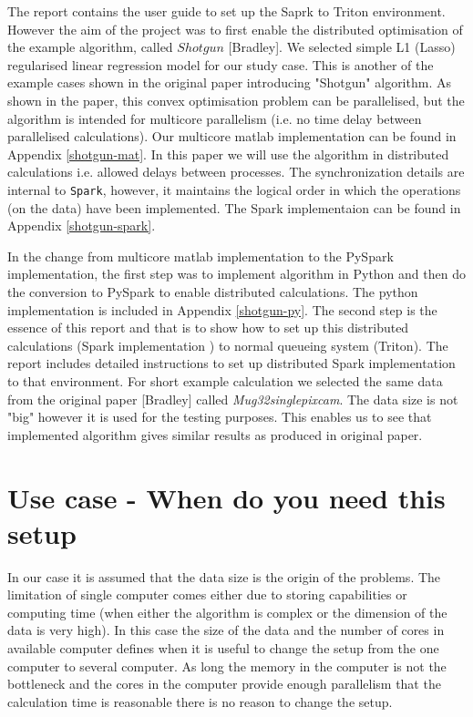 \documentclass[a4paper,11pt]{article}
\begin{document}
The report contains the user guide to set up the Saprk to Triton environment. However the aim of the project was to first enable the distributed optimisation of the example algorithm, called $Shotgun$ [Bradley]. We selected simple L1 (Lasso) regularised linear regression model for our study case. This is another of the example cases shown in the original paper introducing "Shotgun" algorithm. As shown in the paper, this convex optimisation problem can be parallelised, but the algorithm is intended for multicore  parallelism (i.e. no time delay between parallelised calculations). Our multicore matlab implementation can be found in  Appendix \ref{shotgun-mat}. In this paper we will use the algorithm in distributed calculations i.e. allowed delays between processes. The synchronization details are internal to \texttt{Spark}, however, it maintains the logical order in which the operations (on the data) have been implemented. The Spark implementaion can be found in Appendix \ref{shotgun-spark}. 

In the change from multicore matlab implementation to the PySpark implementation, the first step was to implement algorithm in Python and then do the conversion to PySpark to enable distributed calculations. The python implementation is included in Appendix \ref{shotgun-py}. The second step is the essence of this report and that is to show how to set up this distributed calculations (Spark implementation ) to normal queueing system (Triton). The report includes detailed instructions to set up distributed Spark implementation to that environment. For short example calculation we selected the same data from the original paper [Bradley] called \textit{Mug32singlepixcam}. The data size is not "big" however it is used for the testing purposes. This enables us to see that implemented algorithm gives similar results as produced in original paper. 

\section{Use case - When do you need this setup}

In our case it is assumed that the data size is the origin of the problems. The limitation of single computer comes either due to storing capabilities or computing time (when either the algorithm is complex or the dimension of the data is very high). In this case the size of the data and the number of cores in available computer defines when it is useful to change the setup from the one computer to several computer. As long the memory in the computer is not the bottleneck 
and the cores in the computer provide enough parallelism that the 
calculation time is reasonable there is no reason to change the setup.
 
\end{document}

